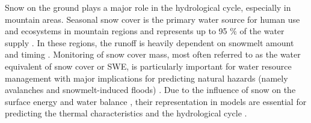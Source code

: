 \documentclass[utf8]{frontiersSCNS} %
\begin{document}
 
Snow on the ground plays a major role in the hydrological cycle, especially in mountain areas. Seasonal snow cover is the primary water source for human use and ecosystems in mountain regions and represents up to 95 $\%$ of the water supply \citep{Liniger_1998}. In these regions, the runoff is heavily dependent on snowmelt amount and timing \citep{Bales_2006,Bowling_2003}. Monitoring of snow cover mass, most often referred to as the water equivalent of snow cover or SWE, is particularly important for water resource management with major implications for predicting natural hazards (namely avalanches and snowmelt-induced floods) \citep{Sui_2001,Finger_2012,Viviroli_2011,Freudiger_2014}. Due to the influence of snow on the surface energy and water balance \citep{Hansen_2004,Flanner_2006,Qu_2014,Hall_2006}, their representation in models are essential for predicting the thermal characteristics and the hydrological cycle \citep{Gouttevin_2012}. 
\end{document}
